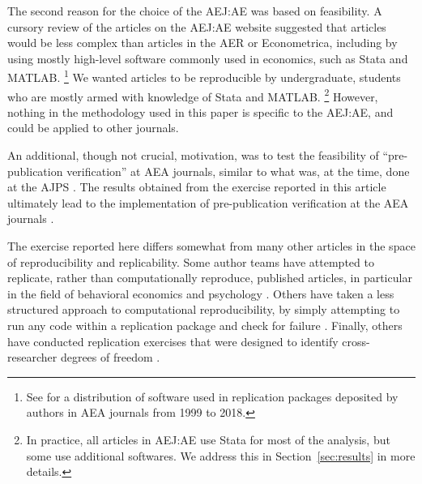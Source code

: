 \documentclass{cje} %
\theoremstyle{plain}%
\theoremstyle{definition}
\theoremstyle{remark}
\begin{document}
The second reason for the choice of the \ac{AEJ:AE} was based on feasibility. A cursory review of the articles on the \ac{AEJ:AE} website suggested that articles would be less complex than articles in the \ac{AER} or Econometrica, including by using mostly high-level software commonly used in economics, such as Stata and MATLAB.%
%
\footnote{See \citet{VilhuberAEAPap.Proc.2020} for a distribution of software used in replication packages deposited by authors in AEA journals from 1999 to 2018.}
We wanted articles to be reproducible by undergraduate, students who are mostly armed with knowledge of Stata and MATLAB.%
%
\footnote{In practice, all articles in \ac{AEJ:AE} use Stata for most of the analysis, but some use additional softwares. We address this in Section~\ref{sec:results} in more details.}
However, nothing in the methodology used in this paper is specific to the \ac{AEJ:AE}, and could be applied to other journals. 

An additional, though not crucial, motivation, was to test the feasibility of ``pre-publication verification'' at AEA journals, similar to what was, at the time, done at the \ac{AJPS} \citep{JacobyShouldJournalsBe2017,Christian2018}. The results obtained from the exercise reported in this article ultimately lead to the implementation of pre-publication verification at the \ac{AEA} journals \citep{10.1257/pandp.109.718,vilhuber2022a}.

The exercise reported here differs somewhat from many other articles in the space of reproducibility and replicability. Some author teams have attempted to replicate, rather than computationally reproduce, published articles, in particular in the field of behavioral economics and psychology \citep{opensciencecollaboration2015b,camerer2016,camerer2018}. Others have taken a less structured approach to computational reproducibility, by simply attempting to run any code within a replication package and check for failure \citep{trisovic2021,wang2020}. Finally, others have conducted replication exercises that were designed to identify cross-researcher degrees of freedom \citep{menkveld2023,huntington-klein2021}.
\end{document}
